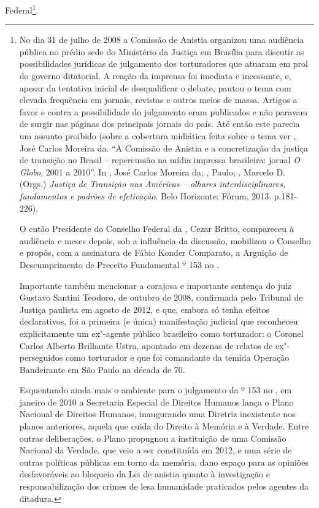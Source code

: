 Federal\footnote{No dia 31 de julho de 2008 a Comissão de Anistia
  organizou uma audiência pública no prédio sede do Ministério da
  Justiça em Brasília para discutir as possibilidades jurídicas de
  julgamento dos torturadores que atuaram em prol do governo ditatorial.
  A reação da imprensa foi imediata e incessante, e, apesar da tentativa
  inicial de desqualificar o debate, pautou o tema com elevada
  frequência em jornais, revistas e outros meios de massa. Artigos a
  favor e contra a possibilidade do julgamento eram publicados e não
  paravam de surgir nas páginas dos principais jornais do país. Até
  então este parecia um assunto proibido (sobre a cobertura midiática
  feita sobre o tema ver  ,
  José Carlos Moreira da. ``A Comissão
  de Anistia e a concretização da justiça de transição no Brasil --
  repercussão na mídia impressa brasileira: jornal \emph{O Globo}, 2001 a
  2010''. In  , José Carlos Moreira
  da; , Paulo; ,
  Marcelo D. (Orgs.) \emph{Justiça de Transição nas Américas --
  olhares interdisciplinares, fundamentos e padrões de efetivação}. Belo
  Horizonte: Fórum, 2013. p.181-226).

  O então Presidente do Conselho Federal da , Cezar Britto,
  compareceu à audiência e meses depois, sob a influência da discussão,
  mobilizou o Conselho e propôs, com a assinatura de Fábio Konder
  Comparato, a Arguição de Descumprimento de Preceito Fundamental º 153
  no .

  Importante também mencionar a corajosa e importante sentença do juiz
  Gustavo Santini Teodoro, de outubro de 2008, confirmada pelo Tribunal
  de Justiça paulista em agosto de 2012, e que, embora só tenha efeitos
  declarativos, foi a primeira (e única) manifestação judicial que
  reconheceu explicitamente um ex"-agente público brasileiro como
  torturador: o Coronel Carlos Alberto Brilhante Ustra, apontado em
  dezenas de relatos de ex"-perseguidos como torturador e que foi
  comandante da temida Operação Bandeirante em São Paulo na década de
  70.

  Esquentando ainda mais o ambiente para o julgamento da  º 153 no
  , em janeiro de 2010 a Secretaria Especial de Direitos Humanos
  lança o  Plano Nacional de Direitos Humanos, inaugurando uma
  Diretriz inexistente nos planos anteriores, aquela que cuida do
  Direito à Memória e à Verdade. Entre outras deliberações, o Plano
  propugnou a instituição de uma Comissão Nacional da Verdade, que veio
  a ser constituída em 2012, e uma série de outras políticas públicas em
  torno da memória, dano espaço para as opiniões desfavoráveis ao
  bloqueio da Lei de anistia quanto à investigação e responsabilização
  dos crimes de lesa humanidade praticados pelos agentes da ditadura.}.

